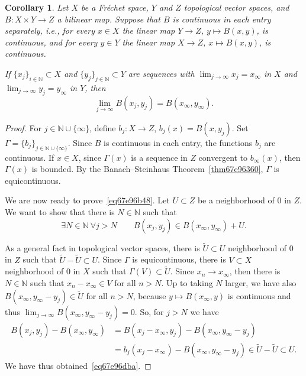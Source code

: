 \documentclass[a4paper,9pt]{amsart}
\newcommand{\N}{\mathbb{N}}	%
\theoremstyle{plain}
\newtheorem{corollary}[proposition]{Corollary}
\theoremstyle{definition}
\theoremstyle{remark}
\begin{document}
\begin{corollary}\label{cor67e96e59}
	Let $X$ be a Fréchet space, $Y$ and $Z$ topological vector spaces,
	and $B:X\times Y\to Z$ a bilinear map.
	Suppose that $B$ is continuous in each entry separately, i.e., 
	for every $x\in X$ the linear map $Y\to Z$, $y\mapsto B(x,y)$, is continuous,
	and for every $y\in Y$ the linear map $X\to Z$, $x\mapsto B(x,y)$, is continuous.
	
	If $\{x_j\}_{i\in\N}\subset X$ and $\{y_j\}_{j\in\N}\subset Y$ are sequences with $\lim_{j\to\infty} x_j = x_\infty$ in $X$ and $\lim_{j\to\infty} y_j = y_\infty$ in $Y$,
	then
	\begin{equation}\label{eq67e96b48}
		\lim_{j\to\infty} B(x_j,y_j) = B(x_\infty,y_\infty) .
	\end{equation}
\end{corollary}
\begin{proof}
	For $j\in\N\cup\{\infty\}$, define $b_j:X\to Z$, $b_j(x) = B(x,y_j)$.
	Set $\Gamma = \{b_j\}_{j\in\N\cup\{\infty\}}$.
	Since $B$ is continuous in each entry, the functions $b_j$ are continuous.
	If $x\in X$, since $\Gamma(x)$ is a sequence in $Z$ convergent to $b_\infty(x)$,
	then $\Gamma(x)$ is bounded.
	By the Banach--Steinhaus Theorem~\ref{thm67e96360}, $\Gamma$ is equicontinuous.
	
	We are now ready to prove~\eqref{eq67e96b48}.
	Let $U\subset Z$ be a neighborhood of $0$ in $Z$.
	We want to show that there is $N\in\N$ such that 
	\begin{equation}\label{eq67e96dba}
		\exists N\in\N\ \forall j>N\qquad
		B(x_j,y_j)\in B(x_\infty,y_\infty) + U .
	\end{equation}
	
	As a general fact in topological vector spaces, there is $\tilde U\subset U$ neighborhood of $0$ in $Z$ such that $\tilde U-\tilde U\subset U$.
	Since $\Gamma$ is equicontinuous, there is $V\subset X$ neighborhood of $0$ in $X$ such that $\Gamma(V)\subset \tilde U$.
	Since $x_n\to x_\infty$, then there is $N\in\N$ such that $x_n-x_\infty \in V$ for all $n>N$.
	Up to taking $N$ larger, we have also $B(x_\infty,y_\infty-y_j)\in \tilde U$ for all $n>N$, 
	because $y\mapsto B(x_\infty,y)$ is continuous and thus $\lim_{j\to\infty} B(x_\infty,y_\infty-y_j) = 0$.
	So, for $j>N$ we have
	\begin{align*}
		B(x_j,y_j) - B(x_\infty,y_\infty)
		&= B(x_j-x_\infty,y_j) - B(x_\infty,y_\infty-y_j)\\
		&= b_j(x_j-x_\infty) - B(x_\infty,y_\infty-y_j) 
		\in \tilde U - \tilde U \subset U .
	\end{align*}
	We have thus obtained~\eqref{eq67e96dba}.
\end{proof}
\end{document}
